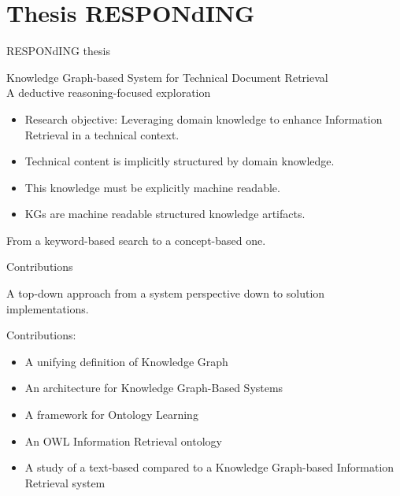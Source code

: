 \section{Thesis RESPONdING}

\begin{frame}{RESPONdING thesis}
    \begin{center}
        Knowledge Graph-based System for Technical Document Retrieval\\A deductive reasoning-focused exploration
    \end{center}
    
    \begin{itemize}
        \item Research objective: Leveraging domain knowledge to enhance Information Retrieval in a technical context.
        \item Technical content is implicitly structured by domain knowledge.
        \item This knowledge must be explicitly machine readable.
        \item KGs are machine readable structured knowledge artifacts.
    \end{itemize}
    
    \begin{center}
        From a keyword-based search to a concept-based one.
    \end{center}
    
\end{frame}

\begin{frame}{Contributions}

    \begin{center}
        A top-down approach from a system perspective down to solution implementations.
    \end{center}

    Contributions:
    \begin{itemize}
        \item A unifying definition of Knowledge Graph
        \item An architecture for Knowledge Graph-Based Systems
        \item A framework for Ontology Learning
        \item An OWL Information Retrieval ontology
        \item A study of a text-based compared to a Knowledge Graph-based Information Retrieval system
    \end{itemize}
    
\end{frame}

